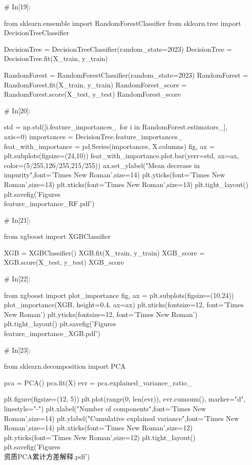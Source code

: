 \documentclass{MathorCupModeling}
\begin{document}
\begin{python}
# In[19]:


from sklearn.ensemble import RandomForestClassifier
from sklearn.tree import DecisionTreeClassifier

DecisionTree = DecisionTreeClassifier(random_state=2023)
DecisionTree = DecisionTree.fit(X_train, y_train)

RandomForest = RandomForestClassifier(random_state=2023)
RandomForest = RandomForest.fit(X_train, y_train)
RandomForest_score = RandomForest.score(X_test, y_test)
RandomForest_score


# In[20]:


std = np.std([i.feature_importances_ for i in RandomForest.estimators_], axis=0)
importances = DecisionTree.feature_importances_
feat_with_importance = pd.Series(importances, X.columns)
fig, ax = plt.subplots(figsize=(24,10))
feat_with_importance.plot.bar(yerr=std, ax=ax, color=(5/255,126/255,215/255))
ax.set_ylabel("Mean decrease in impurity",font='Times New Roman',size=14)
plt.yticks(font='Times New Roman',size=13)
plt.xticks(font='Times New Roman',size=13)
plt.tight_layout()
plt.savefig('Figures\\feature_importance_RF.pdf')


# In[21]:


from xgboost import XGBClassifier

XGB = XGBClassifier()
XGB.fit(X_train, y_train)
XGB_score = XGB.score(X_test, y_test)
XGB_score


# In[22]:


from xgboost import plot_importance
fig, ax = plt.subplots(figsize=(10,24))
plot_importance(XGB, height=0.4, ax=ax)
plt.xticks(fontsize=12, font='Times New Roman')
plt.yticks(fontsize=12, font='Times New Roman')
plt.tight_layout()
plt.savefig('Figures\\feature_importance_XGB.pdf')


# In[23]:


from sklearn.decomposition import PCA

pca = PCA()
pca.fit(X)
evr = pca.explained_variance_ratio_

plt.figure(figsize=(12, 5))
plt.plot(range(0, len(evr)), evr.cumsum(), marker="d", linestyle="-")
plt.xlabel("Number of components",font='Times New Roman',size=14)
plt.ylabel("Cumulative explained variance",font='Times New Roman',size=14)
plt.xticks(font='Times New Roman',size=12)
plt.yticks(font='Times New Roman',size=12)
plt.tight_layout()
plt.savefig('Figures\\资质PCA累计方差解释.pdf')



\end{python}
\end{document}
